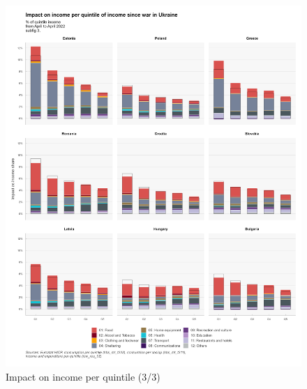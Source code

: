 \documentclass[
  9pt,
  a4paper,
  DIV=11,
  numbers=noendperiod]{scrartcl}
\begin{document}
\begin{figure}

\caption{Impact on income per quintile (3/3)}

{\centering \includegraphics[width=17cm,height=\textheight]{../svg/coicop_l1_1y_3.png}

}

\end{figure}
\end{document}
